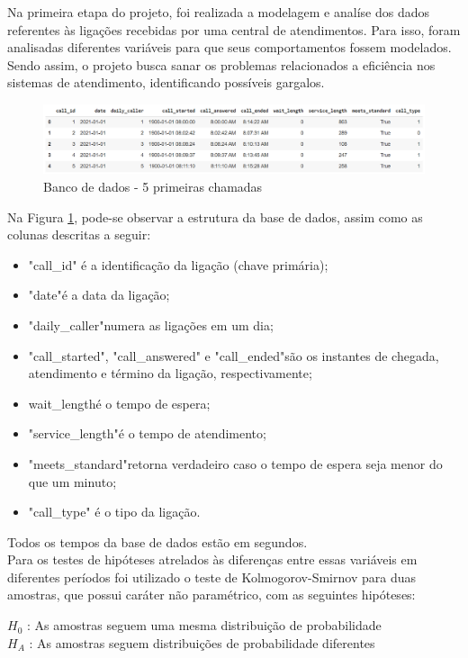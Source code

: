 Na primeira etapa do projeto, foi realizada a modelagem e analíse dos dados referentes às ligações recebidas por uma central de atendimentos. Para isso, foram analisadas diferentes variáveis para que seus comportamentos fossem modelados. Sendo assim, o projeto busca sanar os problemas relacionados a eficiência nos sistemas de atendimento, identificando possíveis gargalos.

\begin{figure}[H]
    \includegraphics[scale= 0.6]{analise-de-dados/intro-analise/imgintro.png}
    \caption{Banco de dados - 5 primeiras chamadas}
    \label{fig: bd_img}
\end{figure}

Na Figura \ref*{fig: bd_img}, pode-se observar a estrutura da base de dados, assim como as colunas descritas a seguir:

\begin{itemize} 
    \item"call\_id" é a identificação da ligação (chave primária);
    \item"date"\;é a data da ligação;
    \item "daily\_caller"\;numera as ligações em um dia;
    \item"call\_started", "call\_answered" e "call\_ended"\;são os instantes de chegada, atendimento e término  da ligação, respectivamente;
    \item wait\_length\;é o tempo de espera;
    \item"service\_length"\;é o tempo de atendimento;
    \item"meets\_standard"\;retorna verdadeiro caso o tempo de espera seja menor do que um minuto;
    \item"call\_type" é o tipo da ligação.
\end{itemize}

Todos os tempos da base de dados estão em segundos.\\
Para os testes de hipóteses atrelados às diferenças entre essas variáveis em diferentes períodos foi utilizado o teste de Kolmogorov-Smirnov para duas amostras, que possui caráter não paramétrico, com as seguintes hipóteses:\\

\begin{center}
$H_0$ : As amostras seguem uma mesma distribuição de probabilidade\\
$H_A$ : As amostras seguem distribuições de probabilidade diferentes
\end{center}

